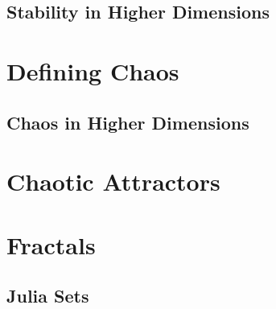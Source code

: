 \documentclass[11pt,a4paper,oneside]{memoir}
\theoremstyle{plain}
\theoremstyle{definition}
\begin{document}
\section{Stability in Higher Dimensions}

\chapter{Defining Chaos}
\section{Chaos in Higher Dimensions}
\chapter{Chaotic Attractors}

\chapter{Fractals}
\section{Julia Sets}


\end{document}
